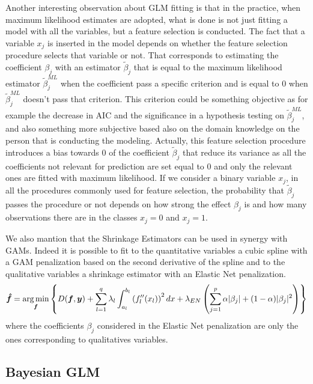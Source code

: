 \documentclass[a4paper, nobind]{templates/ociamthesis}
\theoremstyle{definition}
\theoremstyle{definition}
\theoremstyle{definition}
\theoremstyle{remark}
\begin{document}
Another interesting observation about GLM fitting is that in the practice, when maximum likelihood estimates are adopted, what is done is not just fitting a model with all the variables, but a feature selection is conducted. The fact that a variable \(x_j\) is inserted in the model depends on whether the feature selection procedure selects that variable or not. That corresponds to estimating the coefficient \(\beta_j\) with an estimator \(\tilde{\beta}_j\) that is equal to the maximum likelihood estimator \(\tilde{\beta}_j^{ML}\) when the coefficient pass a specific criterion and is equal to \(0\) when \(\tilde{\beta}_j^{ML}\) doesn't pass that criterion. This criterion could be something objective as for example the decrease in AIC and the significance in a hypothesis testing on \(\tilde{\beta}_j^{ML}\), and also something more subjective based also on the domain knowledge on the person that is conducting the modeling. Actually, this feature selection procedure introduces a bias towards \(0\) of the coefficient \(\tilde{\beta}_j\) that reduce its variance as all the coefficients not relevant for prediction are set equal to \(0\) and only the relevant ones are fitted with maximum likelihood. If we consider a binary variable \(x_j\), in all the procedures commonly used for feature selection, the probability that \(\tilde{\beta}_j\) passes the procedure or not depends on how strong the effect \(\beta_j\) is and how many observations there are in the classes \(x_j=0\) and \(x_j=1\).

We also mantion that the Shrinkage Estimators can be used in synergy with GAMs. Indeed it is possible to fit to the quantitative variables a cubic spline with a GAM penalization based on the second derivative of the spline and to the qualitative variables a shrinkage estimator with an Elastic Net penalization.
\begin{equation}
\label{eq:gam-en-est-deviance-multi}
\boldsymbol{\hat{f}} = \operatorname*{arg\,min}_{\boldsymbol{f}}
{\left\{
  D(\boldsymbol{f}, \boldsymbol{y})
    + \sum_{l=1}^{q}{
      \lambda_l \int_{a_l}^{b_l}{\left( f_l''(x_l) \right)^2 dx}
    }
    + \lambda_{EN} \left(
      \sum_{j=1}^p{\alpha |\beta_j| + (1 - \alpha) |\beta_j|^2}
    \right)
\right\}
} 
\end{equation}
where the coefficients \(\beta_j\) considered in the Elastic Net penalization are only the ones corresponding to qualitatives variables.

\newpage

\hypertarget{bayesian-glm}{%
\subsection{Bayesian GLM}\label{bayesian-glm}}
\end{document}
